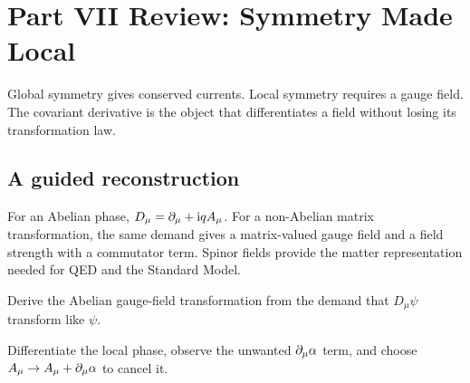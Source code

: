 
\chapter{Part VII Review: Symmetry Made Local}

Global symmetry gives conserved currents.  Local symmetry requires a gauge field.  The covariant derivative is the object that differentiates a field without losing its transformation law.

\section{A guided reconstruction}













For an Abelian phase, \(D_\mu=\partial_\mu+\mathrm i qA_\mu\).  For a non-Abelian matrix transformation, the same demand gives a matrix-valued gauge field and a field strength with a commutator term.  Spinor fields provide the matter representation needed for QED and the Standard Model.

\begin{exercise}
Derive the Abelian gauge-field transformation from the demand that \(D_\mu\psi\) transform like \(\psi\).
\begin{answer}
Differentiate the local phase, observe the unwanted \(\partial_\mu\alpha\) term, and choose \(A_\mu\to A_\mu+\partial_\mu\alpha\) to cancel it.
\end{answer}
\end{exercise}

